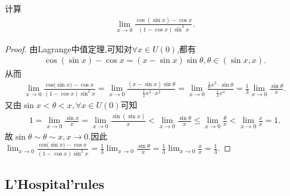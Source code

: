 \documentclass[../../main.tex]{subfiles}%
\begin{document}
\begin{example}
计算
\begin{align*}
\lim_{x \to 0} \frac{\cos(\sin x) - \cos x}{(1 - \cos x)\sin^{2}x}.
\end{align*}
\end{example}
\begin{proof}
由Lagrange中值定理,可知对$\forall x\in U\left( 0 \right)$,都有
\begin{align*}
\cos \left( \sin x \right) -\cos x=\left( x-\sin x \right) \sin \theta ,\theta \in \left( \sin x,x \right) .
\end{align*}
从而
\begin{align*}
\lim_{x\rightarrow 0} \frac{\mathrm{cos(}\sin x)-\cos x}{(1-\cos x)\sin ^2x}=\lim_{x\rightarrow 0} \frac{\left( x-\sin x \right) \sin \theta}{\frac{1}{2}x^2\cdot x^2}=\lim_{x\rightarrow 0} \frac{\frac{1}{6}x^3\cdot \sin \theta}{\frac{1}{2}x^4}=\frac{1}{3}\lim_{x\rightarrow 0} \frac{\sin \theta}{x}.
\end{align*}
又由$\sin x<\theta <x,\forall x\in U\left( 0 \right)$可知
\begin{align*}
1=\lim_{x\rightarrow 0} \frac{\sin x}{x}=\lim_{x\rightarrow 0} \frac{\sin \left( \sin x \right)}{x}<\lim_{x\rightarrow 0} \frac{\sin \theta}{x}\leqslant \lim_{x\rightarrow 0} \frac{\theta}{x}<\lim_{x\rightarrow 0} \frac{x}{x}=1.
\end{align*}
故$\sin \theta \sim \theta \sim x,x\rightarrow 0$.因此$\lim_{x\rightarrow 0} \frac{\mathrm{cos(}\sin x)-\cos x}{(1-\cos x)\sin ^2x}=\frac{1}{3}\lim_{x\rightarrow 0} \frac{\sin \theta}{x}=\frac{1}{3}\lim_{x\rightarrow 0} \frac{x}{x}=\frac{1}{3}$.
\end{proof}



\subsection{L'Hospital'rules}
\end{document}
